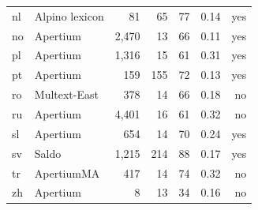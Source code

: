 \documentclass[11pt,a4paper]{article}
\begin{document}
\begin{table}[t]
\begin{tabular}{llrrr|rr}
nl &  Alpino lexicon  & 81 & 65 & 77 & 0.14&yes\\
no & Apertium & 2,470 & 13 & 66 & 0.11 & yes\\
pl & Apertium & 1,316 &  15 & 61 & 0.31 & yes\\
pt & Apertium & 159 & 155 & 72 & 0.13 & yes\\
ro &  Multext-East  & 378 & 14 & 66 & 0.18 & no \\
ru & Apertium & 4,401 &16& 61 & 0.32 & no  \\
sl & Apertium & 654 & 14 & 70 & 0.24 &yes\\
sv & Saldo & 1,215 & 214 & 88 & 0.17 & yes\\
tr & ApertiumMA & 417 & 14 & 74 & 0.32  &no \\
zh & Apertium & 8 & 13 & 34 & 0.16 & no \\

\end{tabular}
\end{table}
\end{document}
